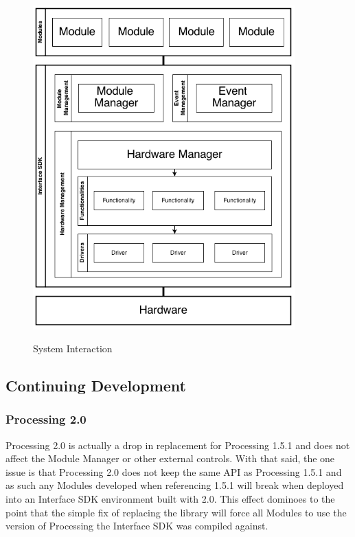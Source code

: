 \documentclass[11pt,letterpaper]{article}
\begin{document}
	\pagebreak
	\begin{figure}[h!]
		\caption{System Interaction}
		\centering
		\includegraphics[width=0.9\textwidth]{interface_sdk}
		\label{fig:system_interaction}
	\end{figure}

	\pagebreak


	\subsection{Continuing Development}
	\label{sec:cont_dev}

	\subsubsection{Processing 2.0} 
	\label{sec:cont_dev_processing}
	Processing 2.0 is actually a drop in replacement for Processing 1.5.1 and does
	not affect the Module Manager or other external controls. With that said, the
	one issue is that Processing 2.0 does not keep the same API as Processing
	1.5.1 and as such any Modules developed when referencing 1.5.1 will break when
	deployed into an Interface SDK environment built with 2.0. This effect
	dominoes to the point that the simple fix of replacing the library will force
	all Modules to use the version of Processing the Interface SDK was compiled
	against. 
\end{document}
